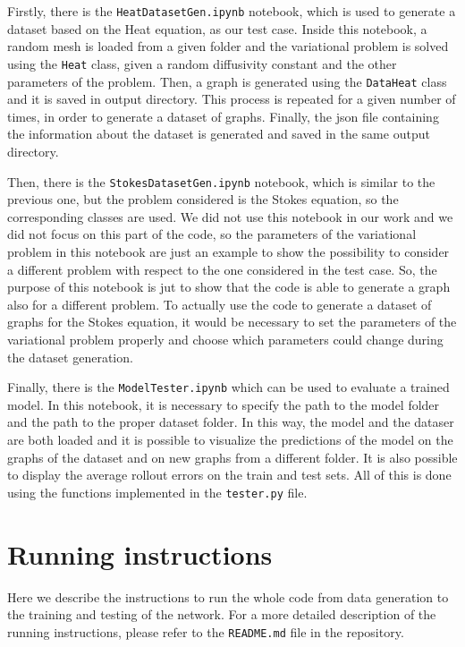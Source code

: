 \documentclass[11pt,a4paper]{article}
\begin{document}
Firstly, there is the \texttt{HeatDatasetGen.ipynb} notebook, which is used to generate a dataset based on the Heat equation, as our test case. Inside this notebook, a random mesh is loaded from a given folder and the variational problem is solved using the \texttt{Heat} class, given a random diffusivity constant and the other parameters of the problem. Then, a graph is generated using the \texttt{DataHeat} class and it is saved in output directory. This process is repeated for a given number of times, in order to generate a dataset of graphs. Finally, the json file containing the information about the dataset is generated and saved in the same output directory. 

Then, there is the \texttt{StokesDatasetGen.ipynb} notebook, which is similar to the previous one, but the problem considered is the Stokes equation, so the corresponding classes are used. We did not use this notebook in our work and we did not focus on this part of the code, so the parameters of the variational problem in this notebook are just an example to show the possibility to consider a different problem with respect to the one considered in the test case. So, the purpose of this notebook is jut to show that the code is able to generate a graph also for a different problem. To actually use the code to generate a dataset of graphs for the Stokes equation, it would be necessary to set the parameters of the variational problem properly and choose which parameters could change during the dataset generation.

Finally, there is the \texttt{ModelTester.ipynb} which can be used to evaluate a trained model. In this notebook, it is necessary to specify the path to the model folder and the path to the proper dataset folder. In this way, the model and the dataser are both loaded and it is possible to visualize the predictions of the model on the graphs of the dataset and on new graphs from a different folder. It is also possible to display the average rollout errors on the train and test sets. All of this is done using the functions implemented in the \texttt{tester.py} file.

\section{Running instructions}

Here we describe the instructions to run the whole code from data generation to the training and testing of the network. For a more detailed description of the running instructions, please refer to the \texttt{README.md} file in the repository.
\end{document}
